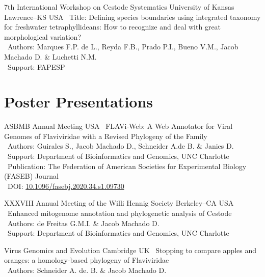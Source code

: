 \documentclass[11pt, letterpaper, sans]{moderncv}
\begin{document}
\vspace{.5em}

\cventry{---}
	{7th International Workshop on Cestode Systematics}
	{University of Kansas}
	{Lawrence--KS}
	{USA}
	{
		\textbullet~Title: Defining species boundaries using integrated taxonomy for freshwater tetraphyllideans: How to recognize and deal with great morphological variation?\\
		\textbullet~Authors: Marques F.P. de L., Reyda F.B., Prado P.I., Bueno V.M., Jacob Machado D. \& Luchetti N.M.\\
		\textbullet~Support: FAPESP
	}

\clearpage


\section{Poster Presentations}

	{ASBMB Annual Meeting}
	{}
	{USA}
	{}
	{
		\textbullet~FLAVi‐Web: A Web Annotator for Viral Genomes of Flaviviridae with a Revised Phylogeny of the Family\\
		\textbullet~Authors: Guirales S.,  Jacob Machado D.,  Schneider A.de B. \&  Janies D.\\
		\textbullet~Support: Department of Bioinformatics and Genomics,  UNC Charlotte\\
		\textbullet~Publication: The Federation of American Societies for Experimental Biology (FASEB) Journal\\
		\textbullet~DOI: \href{https://doi.org/10.1096/fasebj.2020.34.s1.09730}{10.1096/fasebj.2020.34.s1.09730}
	}

\vspace{.5em}

	{XXXVIII Annual Meeting of the Willi Hennig Society}
	{Berkeley--CA}
	{USA}
	{}
	{
		\textbullet~Enhanced mitogenome annotation and phylogenetic analysis of Cestode\\
		\textbullet~Authors: de Freitas G.M.I. \& Jacob Machado D.\\
		\textbullet~Support: Department of Bioinformatics and Genomics,  UNC Charlotte
	}

\vspace{.5em}

	{Virus Genomics and Evolution}
	{Cambridge}
	{UK}
	{}
	{
		\textbullet~Stopping to compare apples and oranges: a homology-based phylogeny of Flaviviridae \\
		\textbullet~Authors: Schneider A. de. B. \& Jacob Machado D.
}
\end{document}
